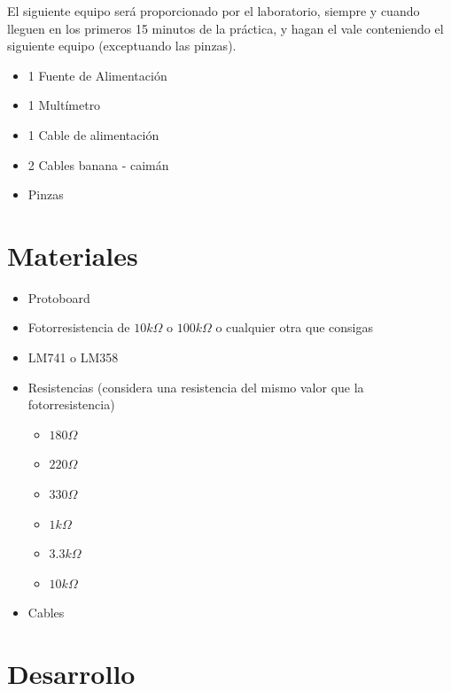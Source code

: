 	El siguiente equipo será proporcionado por el laboratorio, siempre y cuando lleguen en los primeros 15 minutos de la práctica, y hagan el vale conteniendo el siguiente equipo (exceptuando las pinzas).

	\begin{itemize}
		\item 1 Fuente de Alimentación
		\item 1 Multímetro
		\item 1 Cable de alimentación
		\item 2 Cables banana - caimán
		\item Pinzas
	\end{itemize}


\section{Materiales}

	\begin{itemize}
		\item Protoboard
		\item Fotorresistencia de $10 k \Omega$ o $100 k \Omega$ o cualquier otra que consigas
		\item LM741 o LM358
		\item Resistencias (considera una resistencia del mismo valor que la fotorresistencia)
		\begin{itemize}
			\item $180 \Omega$
			\item $220 \Omega$
			\item $330 \Omega$
			\item $1 k\Omega$
			\item $3.3 k\Omega$
			\item $10 k\Omega$
		\end{itemize}
		\item Cables
	\end{itemize}


\section{Desarrollo}
	
